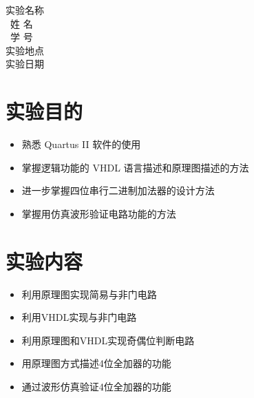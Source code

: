 \documentclass{article}
\begin{document}
\begin{titlepage}
	\vspace*{1cm}
    \begin{center}
            \Large 
            实验名称\ \ \underline{} \\ 
            \vspace{0.3cm}
            \quad\ 姓\; 名 \ \ \underline{} \\ 
            \vspace{0.3cm}
            \quad\ 学\; 号 \ \ \underline{}\\
            \vspace{0.3cm}
            实验地点\ \ \underline{}\\
            \vspace{0.3cm}
            实验日期\ \ \underline{}\\
             
    \end{center}
        
    
\end{titlepage}

\newpage
\tableofcontents
\thispagestyle{empty}%
\listoffigures%
\thispagestyle{empty}%

\newpage
{}%


\section{实验目的}
\begin{itemize}
 \item 熟悉 Quartus II 软件的使用
 \item 掌握逻辑功能的 VHDL 语言描述和原理图描述的方法
 \item 进一步掌握四位串行二进制加法器的设计方法
 \item 掌握用仿真波形验证电路功能的方法

\end{itemize}

\section{实验内容}
\begin{itemize}
\item 利用原理图实现简易与非门电路
\item 利用VHDL实现与非门电路
\item 利用原理图和VHDL实现奇偶位判断电路
\item 用原理图方式描述4位全加器的功能
\item 通过波形仿真验证4位全加器的功能
\end{itemize}
\end{document}

